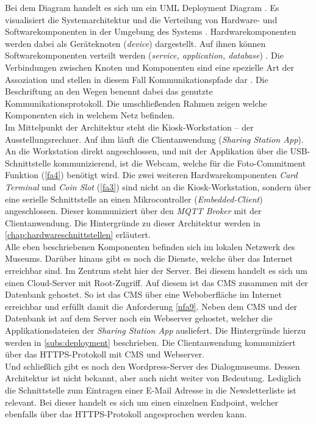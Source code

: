 Bei dem Diagram handelt es sich um ein UML Deployment Diagram \cite{uml-spec}. 
Es visualisiert die Systemarchitektur und die Verteilung von Hardware- und Softwarekomponenten in der 
Umgebung des Systems \cite{uml-2.5}. Hardwarekomponenten werden dabei als Geräteknoten
(\emph{device}) dargestellt. Auf ihnen können Softwarekomponenten verteilt werden (\emph{service,
application, database}) \cite{uml-diagrams, uml-2.5}. Die Verbindungen zwischen Knoten und Komponenten
sind eine spezielle Art der Assoziation und stellen in diesem Fall Kommunikationspfade dar \cite{uml-2.5}.
Die Beschriftung an den Wegen benennt dabei das genutzte Kommunikationsprotokoll.
Die umschließenden Rahmen zeigen welche Komponenten sich in welchem Netz befinden.\\
Im Mittelpunkt der Architektur steht die Kiosk-Workstation -- der Ausstellungsrechner. Auf ihm läuft
die Clientanwendung (\emph{Sharing Station App}). An die Workstation direkt angeschlossen, und mit der
Applikation über die USB-Schnittstelle kommunizierend, ist die Webcam, 
welche für die Foto-Commitment Funktion (\ref{fa4}) benötigt wird. 
Die zwei weiteren Hardwarekomponenten \emph{Card Terminal} und \emph{Coin Slot} (\ref{fa3}) sind nicht 
an die Kiosk-Workstation, sondern über eine serielle Schnittstelle an einen
Mikrocontroller (\emph{Embedded-Client}) angeschlossen. Dieser kommuniziert über
den \emph{MQTT Broker} mit der Clientanwendung. Die Hintergründe zu dieser Architektur werden in
\autoref{chap:hardwareschnittstellen} erläutert.\\
Alle eben beschriebenen Komponenten befinden sich im lokalen Netzwerk des Museums. Darüber hinaus gibt 
es noch die Dienste, welche über das Internet erreichbar sind. Im Zentrum steht hier der Server. 
Bei diesem handelt es sich um einen Cloud-Server mit Root-Zugriff. Auf diesem ist das CMS zusammen mit
der Datenbank gehostet. So ist das CMS über eine Weboberfläche im Internet erreichbar und erfüllt
damit die Anforderung \ref{nfa9}. Neben dem CMS und der Datenbank ist auf dem Server noch ein
Webserver gehostet, welcher die Applikationsdateien der \emph{Sharing
Station App} ausliefert. Die Hintergründe hierzu werden in \autoref{subs:deployment} beschrieben.
Die Clientanwendung kommuniziert über das HTTPS-Protokoll mit CMS und Webserver.\\
Und schließlich gibt es noch den Wordpress-Server des Dialogmuseums. Dessen Architektur ist nicht bekannt,
aber auch nicht weiter von Bedeutung. Lediglich die Schnittstelle zum Eintragen einer E-Mail Adresse in 
die Newsletterliste ist relevant. Bei dieser handelt es sich um einen einzelnen Endpoint, welcher ebenfalls
über das HTTPS-Protokoll angesprochen werden kann. 